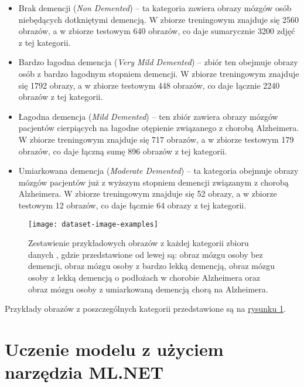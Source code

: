 \begin{itemize}

  \item
        Brak demencji (\emph{Non Demented}) -- ta kategoria zawiera obrazy mózgów osób niebędących dotkniętymi demencją.
        W zbiorze treningowym znajduje się 2560 obrazów, a w zbiorze testowym 640 obrazów, co daje sumarycznie 3200 zdjęć z tej kategorii.

  \item
        Bardzo łagodna demencja (\emph{Very Mild Demented}) -- zbiór ten obejmuje obrazy osób z bardzo łagodnym stopniem demencji.
        W zbiorze treningowym znajduje się 1792 obrazy, a w zbiorze testowym 448 obrazów, co daje łącznie 2240 obrazów z tej kategorii.

  \item
        Łagodna demencja (\emph{Mild Demented}) -- ten zbiór zawiera obrazy mózgów pacjentów cierpiących na łagodne otępienie związanego z chorobą Alzheimera.
        W zbiorze treningowym znajduje się 717 obrazów, a w zbiorze testowym 179 obrazów, co daje łączną sumę 896 obrazów z tej kategorii.

  \item
        Umiarkowana demencja (\emph{Moderate Demented}) -- ta kategoria obejmuje obrazy mózgów pacjentów już z wyższym stopniem demencji związanym z chorobą Alzheimera.
        W zbiorze treningowym znajduje się 52 obrazy, a w zbiorze testowym 12 obrazów, co daje łącznie 64 obrazy z tej kategorii.

\end{itemize}

\begin{figure}[ht]
  \texttt{[image: dataset-image-examples]}
  \caption[Zestawienie przykładowych obrazów z każdej kategorii zbioru danych]{Zestawienie przykładowych obrazów z każdej kategorii zbioru danych \cite{kaggle-alzheimers-dataset}, gdzie przedstawione od lewej są: obraz mózgu osoby bez demencji, obraz mózgu osoby z bardzo lekką demencją, obraz mózgu osoby z lekką demencją o podłożach w chorobie Alzheimera oraz obraz mózgu osoby z umiarkowaną demencją chorą na Alzheimera.}
  \label{fig:dataset-image-examples}
\end{figure}

Przykłady obrazów z poszczególnych kategorii przedstawione są na \hyperref[fig:dataset-image-examples]{rysunku \ref*{fig:dataset-image-examples}}.

\section{Uczenie modelu z użyciem narzędzia ML.NET}


